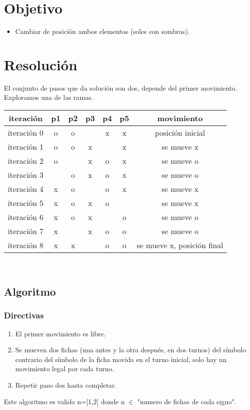 \documentclass[a4paper,10pt]{article}
\begin{document}
\section{Objetivo}
\begin{itemize}
	\item Cambiar de posición ambos elementos (soles con sombras).
\end{itemize}
\section{Resolución}
El conjunto de pasos que da solución son dos, depende del primer movimiento.\\
Exploramos una de las ramas.\\
\centering
\begin{tabular}{ c  c  c  c  c  c  c }
	iteración & p1 & p2 & p3 & p4 & p5 & movimiento \\
	\hline
  iteración 0 & o & o &  & x & x & posición inicial \\
	iteración 1 & o & o & x &  & x & se mueve x \\
	iteración 2 & o &  & x & o & x & se mueve o \\
	iteración 3 &  & o & x & o & x & se mueve o \\
	iteración 4 & x & o &  & o & x & se mueve x \\
	iteración 5 & x & o & x & o &  & se mueve x \\
	iteración 6 & x & o & x &  & o & se mueve o \\
	iteración 7 & x &  & x & o & o & se mueve o \\
	iteración 8 & x & x &  & o & o & se mueve x, posición final \\
  \end{tabular}\\
\raggedright
\subsection{Algoritmo}
\subsubsection{Directivas}
\begin{enumerate}
	\item El primer movimiento es libre.
	\item Se mueven dos fichas (una antes y la otra después, en dos turnos) del símbolo contrario del símbolo de la ficha movida en el turno inicial, solo hay un movimiento legal por cada turno.\\
	\item Repetir paso dos hasta completar.
\end{enumerate}
Este algoritmo es valido n=[1,2] donde n $\in$ "numero de fichas de cada signo".
\end{document}
